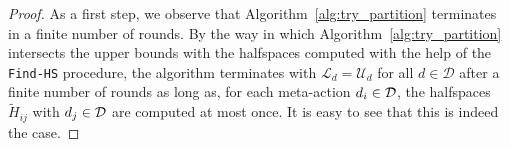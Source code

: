 \partitioncomplexity*
\begin{proof}
%
%
%
As a first step, we observe that Algorithm~\ref{alg:try_partition} terminates in a finite number of rounds.
%
By the way in which Algorithm~\ref{alg:try_partition} intersects the upper bounds with the halfspaces computed with the help of the \texttt{Find-HS} procedure, the algorithm terminates with $\mathcal{L}_d = \mathcal{U}_d$ for all $d \in \mathcal{D}$ after a finite number of rounds as long as, for each meta-action $d_i \in \mathcal{D}$, the halfspaces $\widetilde{H}_{ij}$ with $d_j \in \mathcal{D}$ are computed at most once.
%
It is easy to see that this is indeed the case.
%
%

\end{proof}
